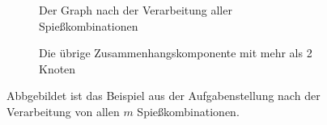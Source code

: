 \begin{figure}[ht]
\centering
\begin{subfigure}[b]{.49\textwidth}
\centering

\caption{Der Graph nach der Verarbeitung aller Spießkombinationen}
\label{fig:graph-after-infos}
\end{subfigure}
\begin{subfigure}[b]{.49\textwidth}
\centering

\caption{Die übrige Zusammenhangskomponente mit mehr als 2 Knoten}
\label{fig:component-left}
\end{subfigure}
\caption{Abbgebildet ist das Beispiel aus der Aufgabenstellung nach
der Verarbeitung von allen $m$ Spießkombinationen.}
\label{fig:graph-after-analysis}
\end{figure}

